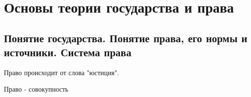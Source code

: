\section{Основы теории государства и права}

\subsection{Понятие государства. Понятие права, его нормы и источники. Система права}

Право происходит от слова "юстиция".

Право - совокупность